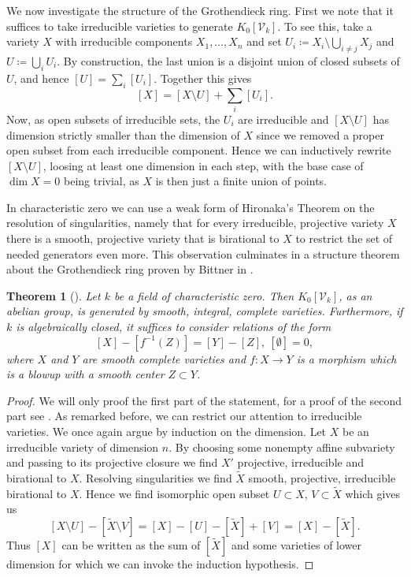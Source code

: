 \documentclass[11pt, a4paper, german, twoside]{article}
\theoremstyle{plain}
\newtheorem{theorem}{Theorem}[section]
\theoremstyle{definition}
\newcommand{\gring}[1][k]{K_0[\mathcal{V}_#1]}
\begin{document}
We now investigate the structure of the Grothendieck ring. First we note that it suffices to take irreducible varieties to generate $\gring[k]$.
To see this, take a variety $X$ with irreducible components $X_1, \dots, X_n$ and set ${U_i \coloneqq X_i \setminus \bigcup_{i \neq j} X_j}$ and
$U \coloneqq \bigcup_i U_i$. By construction, the last union is a disjoint union of closed subsets of $U$, 
and hence $[U] = \sum_i [U_i]$. Together this gives
\[
    [X] = [X \setminus U] + \sum_i [U_i].
\] Now, as open subsets of irreducible sets, the $U_i$ are irreducible and $[X \setminus U]$ has dimension
strictly smaller than the dimension of $X$ since we removed a proper open subset from each irreducible component. Hence we can inductively
rewrite $[X \setminus U]$, loosing at least one dimension in each step, with the base case of $\dim  X = 0$ being trivial, as $X$ is then
just a finite union of points.

In characteristic zero we can use a weak form of Hironaka's Theorem on the resolution of singularities, namely that for every irreducible, 
projective variety $X$ there is a smooth, projective variety that is birational to $X$ to restrict the set of needed generators even more. 
This observation culminates in a structure theorem about the Grothendieck ring proven by Bittner in \cite{Bittner}.


\begin{theorem}[{\cite[Thm. 3.1]{Bittner}}]
    \label{bittner}
    Let $k$ be a field of characteristic zero. Then $\gring[k]$, as an abelian group, is generated by smooth, integral, complete varieties.
    Furthermore, if $k$ is algebraically closed, it suffices to consider relations of the form
    \[
        [X] - [f^{-1}(Z)] = [Y] - [Z],\ [\emptyset] = 0,
    \]
    where $X$ and $Y$ are smooth complete varieties and $f \colon X \to Y$ is a morphism which is a blowup with a smooth center $Z \subset Y$. 
\end{theorem}
\begin{proof}
    We will only proof the first part of the statement, for a proof of the second part see \cite{Bittner}. As remarked before, we can restrict our
    attention to irreducible varieties.  We once again argue by induction on the dimension.
    Let $X$ be an irreducible variety of dimension $n$. By choosing some nonempty affine subvariety and passing to its projective closure we
    find $X'$ projective, irreducible and birational to $X$. Resolving singularities we find $\widetilde{X}$ smooth, projective, irreducible
    birational to $X$. Hence we find isomorphic open subset $U \subset X$, $V \subset \widetilde{X}$ which gives us
    \[
        [X \setminus U ] - [\widetilde{X} \setminus V] = [X] - [U] - [\widetilde{X}] + [V] = [X] - [\widetilde{X}].
    \]
    Thus $[X]$ can be written as the sum of $[\widetilde{X}]$ and some varieties of lower dimension for which we can invoke the induction
    hypothesis.
\end{proof}
\end{document}
